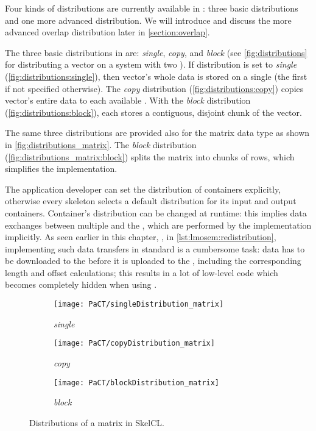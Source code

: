 Four kinds of distributions are currently available in \SkelCL:
three basic distributions and one more advanced distribution.
We will introduce and discuss the more advanced overlap distribution later in \autoref{section:overlap}.

The three basic distributions in \SkelCL are:
\emph{single}, \emph{copy}, and \emph{block} (see \autoref{fig:distributions} for distributing a vector on a system with two \GPUs).
If distribution is set to \emph{single} (\autoref{fig:distributions:single}), then vector's whole data is stored on a single \GPU (the first \GPU if not specified otherwise).
The \emph{copy} distribution (\autoref{fig:distributions:copy}) copies vector's entire data to each available \GPU.
With the \emph{block} distribution (\autoref{fig:distributions:block}), each \GPU stores a contiguous, disjoint chunk of the vector.

The same three distributions are provided also for the matrix data type as shown in \autoref{fig:distributions_matrix}.
The \emph{block} distribution (\autoref{fig:distributions_matrix:block}) splits the matrix into chunks of rows, which simplifies the implementation.

The application developer can set the distribution of containers explicitly, otherwise every skeleton selects a default distribution for its input and output containers.
Container's distribution can be changed at runtime:
this implies data exchanges between multiple \GPUs and the \CPU, which are performed by the \SkelCL implementation implicitly.
As seen earlier in this chapter, \eg, in \autoref{lst:lmosem:redistribution}, implementing such data transfers in standard \OpenCL is a cumbersome task:
data has to be downloaded to the \CPU before it is uploaded to the \GPUs, including the corresponding length and offset calculations;
this results in a lot of low-level code which becomes completely hidden when using \SkelCL.

\begin{figure}[tbp]
  \centering
  \begin{subfigure}{.22\textwidth}
    \texttt{[image: PaCT/singleDistribution\_matrix]}
    \caption{\emph{single}}
    \label{fig:distributions_matrix:single}
  \end{subfigure}
  \hfill
  \begin{subfigure}{.22\textwidth}
    \texttt{[image: PaCT/copyDistribution\_matrix]}
    \caption{\emph{copy}}
    \label{fig:distributions_matrix:copy}
  \end{subfigure}
  \hfill
  \begin{subfigure}{.22\textwidth}
    \texttt{[image: PaCT/blockDistribution\_matrix]}
    \caption{\emph{block}}
    \label{fig:distributions_matrix:block}
  \end{subfigure}
  \caption{Distributions of a matrix in SkelCL.}
  \label{fig:distributions_matrix}
\end{figure}

